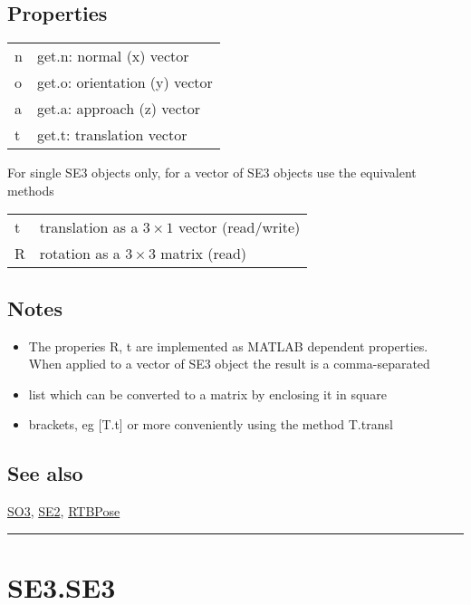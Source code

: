 \subsection*{Properties}
\begin{longtable}{lp{120mm}}
n & get.n: normal (x) vector\\ 
o & get.o: orientation (y) vector\\ 
a & get.a: approach (z) vector\\ 
t & get.t: translation vector\\ 
\end{longtable}\vspace{1ex}


For single SE3 objects only, for a vector of SE3 objects use the
equivalent methods

\begin{longtable}{lp{120mm}}
t & translation as a $3 \times 1$ vector (read/write)\\ 
R & rotation as a $3 \times 3$ matrix (read)\\ 
\end{longtable}\vspace{1ex}

\subsection*{Notes}
\begin{itemize}
  \item The properies R, t are implemented as MATLAB dependent properties.     When applied to a vector of SE3 object the result is a comma-separated
  \item list which can be converted to a matrix by enclosing it in square
  \item brackets, eg [T.t] or more conveniently using the method T.transl
\end{itemize}

\subsection*{See also}


\hyperlink{SO3}{\color{blue} SO3}, \hyperlink{SE2}{\color{blue} SE2}, \hyperlink{RTBPose}{\color{blue} RTBPose}

\vspace{1.5ex}\hrule

\hypertarget{SE3.SE3}{\section*{SE3.SE3}}

